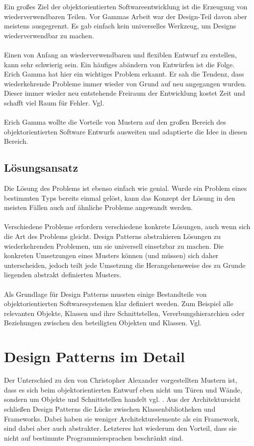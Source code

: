 \documentclass[fontsize=11pt,a4paper,final]{scrreprt}[2003/01/01]
\begin{document}
Ein großes Ziel der objektorientierten Softwareentwicklung ist die Erzeugung von wiederverwendbaren Teilen. Vor Gammas Arbeit war der Design-Teil davon aber meistens ausgegrenzt. Es gab einfach kein universelles Werkzeug, um Designs wiederverwendbar zu machen.
\\ \\
Einen von Anfang an wiederverwendbaren und flexiblen Entwurf zu erstellen, kann sehr schwierig sein. Ein häufiges abändern von Entwürfen ist die Folge. Erich Gamma hat hier ein wichtiges Problem erkannt. Er sah die Tendenz, dass wiederkehrende Probleme immer wieder von Grund auf neu angegangen wurden. Dieser immer wieder neu entstehende Freiraum der Entwicklung kostet Zeit und schafft viel Raum für Fehler. Vgl. \cite[S. 1]{gamma2004}
\\ \\
Erich Gamma wollte die Vorteile von Mustern auf den großen Bereich des objektorientierten Software Entwurfs ausweiten und adaptierte die Idee in diesen Bereich.

\section{Lösungsansatz}\label{se:Lösungsansatz}

Die Lösung des Problems ist ebenso einfach wie genial. Wurde ein Problem eines bestimmten Typs bereits einmal gelöst, kann das Konzept der Lösung in den meisten Fällen auch auf ähnliche Probleme angewandt werden.
\\ \\
Verschiedene Probleme erfordern verschiedene konkrete Lösungen, auch wenn sich die Art des Problems gleicht. Design Patterns abstrahieren Lösungen zu wiederkehrenden Problemen, um sie universell einsetzbar zu machen. Die konkreten Umsetzungen eines Musters können (und müssen) sich daher unterscheiden, jedoch teilt jede Umsetzung die Herangehensweise des zu Grunde liegenden abstrakt definierten Musters.
\\ \\
Als Grundlage für Design Patterns mussten einige Bestandteile von objektorientierten Softwaresystemen klar definiert werden. Zum Beispiel alle relevanten Objekte, Klassen und ihre Schnittstellen, Vererbungshierarchien oder Beziehungen zwischen den beteiligten Objekten und Klassen. Vgl. \cite[S. 1]{gamma2004}

\chapter{Design Patterns im Detail}\label{se:Design Patterns im Detail}
Der Unterschied zu den von Christopher Alexander vorgestellten Mustern ist, dass es sich beim objektorientierten Entwurf eben nicht um Türen und Wände, sondern um Objekte und Schnittstellen handelt vgl. \cite[S. 3]{gamma2004}.
Aus der Architektursicht schließen Design Patterns die Lücke zwischen Klassenbibliotheken und Frameworks. Dabei haben sie weniger Architekturelemente als ein Framework, sind dabei aber auch abstrakter. Letzteres hat wiederum den Vorteil, dass sie nicht auf bestimmte Programmiersprachen beschränkt sind.
\end{document}
